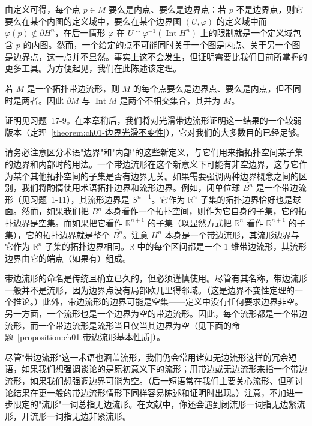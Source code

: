 \documentclass[../../main.tex]{subfiles}
\begin{document}
由定义可得，每个点 $p\in M$ 要么是内点、要么是边界点：若 $p$ 不是边界点，则它要么在某个内图的定义域中，要么在某个边界图 $(U,\varphi)$ 的定义域中而 $\varphi(p)\notin\partial H^{n}$，在后一情形 $\varphi$ 在 $U\cap\varphi^{-1}(\operatorname{Int}H^{n})$ 上的限制就是一个定义域包含 $p$ 的内图。然而，一个给定的点不可能同时关于一个图是内点、关于另一个图是边界点，这一点并不显然。事实上这不会发生，但证明需要比我们目前所掌握的更多工具。为方便起见，我们在此陈述该定理。

\begin{theorem}[边界的拓扑不变性]\label{theorem:ch01-边界拓扑不变性}
若 $M$ 是一个拓扑带边流形，则 $M$ 的每个点要么是边界点、要么是内点，但不同时是两者。因此 $\partial M$ 与 $\operatorname{Int}M$ 是两个不相交集合，其并为 $M$。
\end{theorem}

证明见习题~17-9。在本章稍后，我们将对光滑带边流形证明这一结果的一个较弱版本（定理~\cref{theorem:ch01-边界光滑不变性}），它对我们的大多数目的已经足够。

请务必注意区分术语"边界"和"内部"的这些新定义，与它们用来指拓扑空间某子集的边界和内部时的用法。一个带边流形在这个新意义下可能有非空边界，这与它作为某个其他拓扑空间的子集是否有边界无关。如果需要强调两种边界概念之间的区别，我们将酌情使用术语拓扑边界和流形边界。例如，闭单位球 $\overline{B^{n}}$ 是一个带边流形（见习题~1-11），其流形边界是 $S^{n-1}$。它作为 $\mathbb{R}^{n}$ 子集的拓扑边界恰好也是球面。然而，如果我们把 $\overline{B^{n}}$ 本身看作一个拓扑空间，则作为它自身的子集，它的拓扑边界是空集。而如果把它看作 $\mathbb{R}^{n+1}$ 的子集（以显然方式把 $\mathbb{R}^{n}$ 看作 $\mathbb{R}^{n+1}$ 的子集），它的拓扑边界就是整个 $\overline{B^{n}}$。注意 $H^{n}$ 本身是一个带边流形，其流形边界与它作为 $\mathbb{R}^{n}$ 子集的拓扑边界相同。$\mathbb{R}$ 中的每个区间都是一个 $1$ 维带边流形，其流形边界由它的端点（如果有）组成。

带边流形的命名是传统且确立已久的，但必须谨慎使用。尽管有其名称，带边流形一般并不是流形，因为边界点没有局部欧几里得邻域。（这是边界不变性定理的一个推论。）此外，带边流形的边界可能是空集——定义中没有任何要求边界非空。另一方面，一个流形也是一个边界为空的带边流形。因此，每个流形都是一个带边流形，而一个带边流形是流形当且仅当其边界为空（见下面的命题~\cref{proposition:ch01-带边流形基本性质}）。

尽管"带边流形"这一术语也涵盖流形，我们仍会常用诸如无边流形这样的冗余短语，如果我们想强调谈论的是原初意义下的流形；用带边或无边流形来指一个带边流形，如果我们想强调边界可能为空。（后一短语常在我们主要关心流形、但所讨论结果在更一般的带边流形情形下同样容易陈述和证明时出现。）注意，不加进一步限定的"流形"一词总指无边流形。在文献中，你还会遇到闭流形一词指无边紧流形，开流形一词指无边非紧流形。
\end{document}
